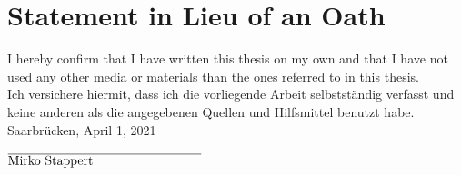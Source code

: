 \chapter*{Statement in Lieu of an Oath}
I hereby confirm that I have written this thesis on my own and that I have not used any other media or materials than the ones referred to in this thesis.\\[0.5cm]
Ich versichere hiermit, dass ich die vorliegende Arbeit selbstst\"andig verfasst und keine anderen als die angegebenen Quellen und Hilfsmittel benutzt habe.\\[1.5cm]

\noindent Saarbr\"ucken, April 1, 2021
\begin{flushright}
  $\overline{\mbox{Mirko Stappert}\makebox[3cm]{}}$
\end{flushright}

